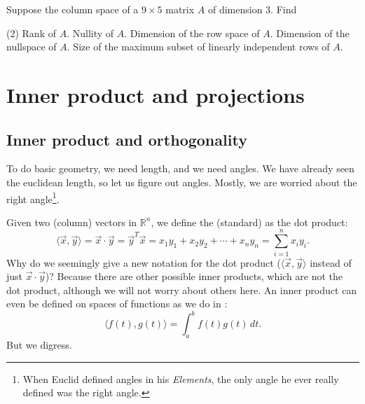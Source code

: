 \begin{exercise}
Suppose the column space of a $9 \times 5$ matrix $A$ of dimension 3.  Find
\begin{tasks}(2)
\task
Rank of $A$.
\task
Nullity of $A$.
\task
Dimension of the row space of $A$.
\task
Dimension of the nullspace of $A$.
\task
Size of the maximum subset of
linearly independent rows of $A$.
\end{tasks}
\end{exercise}


\sectionnewpage
\section{Inner product and projections}
\label{innerproduct:section}



\subsection{Inner product and orthogonality}

To do basic geometry, we need length, and we need angles.
We have already seen the euclidean length, so let us figure out angles. 
Mostly, we are worried about 
the right angle\footnote{When Euclid defined angles in his
\emph{Elements}, the only angle he ever really defined was the right angle.}.

Given two (column) vectors in ${\mathbb{R}}^n$,
we define the (standard)
\emph{} as
the dot product:
\begin{equation*}
\langle \vec{x} , \vec{y} \rangle =
\vec{x} \cdot \vec{y}
=
\vec{y}^T \vec{x}
=
x_1 y_1 + x_2 y_2 + \cdots + x_n y_n
=
\sum_{i=1}^n x_i y_i .
\end{equation*}
Why do we seemingly give a new notation for the dot product
($\langle \vec{x} , \vec{y} \rangle$ instead of just
$\vec{x} \cdot \vec{y}$)?  
Because there are other possible inner products, which are not the dot
product, although we will not worry about others here.
An inner product can even be defined on spaces of functions
as we do in
:
\begin{equation*}
\langle f(t) , g(t) \rangle =
\int_{a}^{b}
f(t) g(t) \, dt .
\end{equation*}
But we digress.

